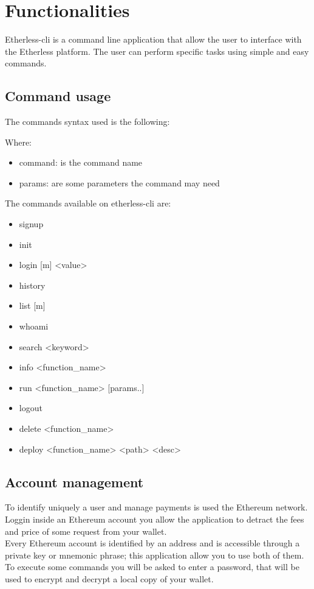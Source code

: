 \section{Functionalities}
Etherless-cli is a command line application that allow the user to interface with the Etherless platform. The user can perform specific tasks using simple and easy commands.

\subsection{Command usage}
The commands syntax used is the following:
\begin{center}
\end{center}
Where:
\begin{itemize}
	\item command: is the command name
	\item params: are some parameters the command may need
\end{itemize}

\noindent The commands available on etherless-cli are:
\begin{itemize}
	\item signup
	\item init
	\item login [m] <value>
	\item history
	\item list [m]
	\item whoami
	\item search <keyword>
	\item info <function\_name>
	\item run <function\_name> [params..]
	\item logout
	\item delete <function\_name>
	\item deploy <function\_name> <path> <desc>
\end{itemize}

\subsection{Account management}
To identify uniquely a user and manage payments is used the Ethereum network. Loggin inside an Ethereum account you allow the application to detract the fees and price of some request from your wallet. \\
Every Ethereum account is identified by an address and is accessible through a private key or mnemonic phrase; this application allow you to use both of them. \\
To execute some commands you will be asked to enter a password, that will be used to encrypt and decrypt a local copy of your wallet.

